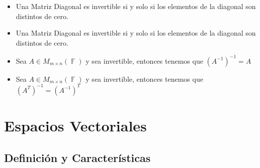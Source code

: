 \documentclass[12pt, fleqn]{report}                             %
\newenvironment{SmallIndentation}[1][0.75em]                    %
        {\begin{adjustwidth}{#1}{}\begin{footnotesize}}             %
        {\end{footnotesize}\end{adjustwidth}}                       %
\theoremstyle{break}                                            %
\DeclareMathOperator \GenericField {\mathbb{F}}                 %
\begin{document}
\begin{itemize}
\begin{SmallIndentation}[1em]
                        \end{SmallIndentation}

                    \clearpage

                    \item Una Matriz Diagonal es invertible si y solo si los elementos de la diagonal
                        son distintos de cero.

                    \item Una Matriz Diagonal es invertible si y solo si los elementos de la diagonal
                        son distintos de cero.

                    \item Sea $A \in M_{m \times n}(\GenericField)$ y sea invertible, entonces tenemos
                        que $(A^{-1})^{-1} = A$

                    \item Sea $A \in M_{m \times n}(\GenericField)$ y sea invertible, entonces tenemos
                        que $(A^T)^{-1} = (A^{-1})^T$

                \end{itemize}
            

















\part{Espacios Vectoriales}
\clearpage


    \chapter{Definición y Características}
\end{document}
